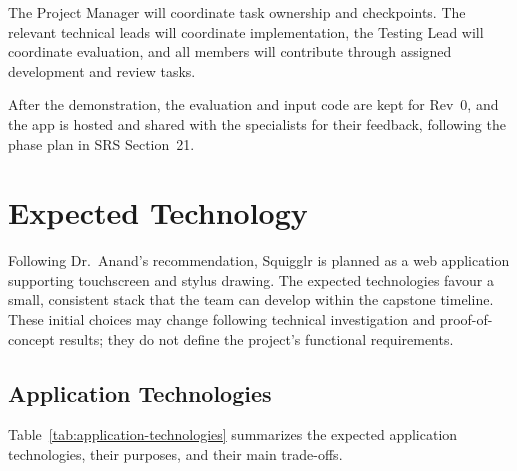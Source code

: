 \documentclass{article}
\begin{document}
The Project Manager will coordinate task ownership and checkpoints.
The relevant technical leads will coordinate implementation, the
Testing Lead will coordinate evaluation, and all members will
contribute through assigned development and review tasks.

After the demonstration, the evaluation and input code are kept for Rev~0,
and the app is hosted and shared with the specialists for their feedback,
following the phase plan in SRS Section~21.

\section{Expected Technology}

\label{sec:expected-technology}

Following Dr.~Anand's recommendation, Squigglr is planned as a web
application supporting touchscreen and stylus drawing. The expected
technologies favour a small, consistent stack that the team can develop
within the capstone timeline. These initial choices may change following
technical investigation and proof-of-concept results; they do not define
the project's functional requirements.

\subsection{Application Technologies}

Table~\ref{tab:application-technologies} summarizes the expected
application technologies, their purposes, and their main trade-offs.
\end{document}
